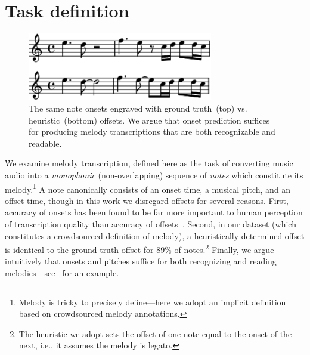\section{Task definition}
\label{sec:task}

\begin{figure}
    \centering
    \includegraphics[width=8.1cm]{figs/heuristic_offsets.pdf}
    \caption{
The same note onsets engraved with ground truth~(top) vs. heuristic~(bottom) offsets. 
We argue that onset prediction suffices for producing melody transcriptions that are both recognizable and readable. 
}
 \label{fig:heuristic_offsets}
\end{figure}


We examine melody transcription, defined here as the task of converting music audio into a \emph{monophonic} (non-overlapping) sequence of \emph{notes} which constitute its melody.\footnote{Melody is tricky to precisely define---here we adopt an implicit definition based on crowdsourced melody annotations.} 
A note canonically consists of an onset time, a musical pitch, and an offset time, though in this work  
we disregard offsets for several reasons. 
First, accuracy of onsets has been found to be far more important to human perception of transcription quality than accuracy of offsets~\cite{ycart2020investigating}. 
Second, in our dataset (which constitutes a crowdsourced definition of melody), a heuristically-determined offset is identical to the ground truth offset for $89\%$ of notes.\footnote{The heuristic we adopt sets the offset of one note equal to the onset of the next, i.e., it assumes the melody is legato.}
Finally, we argue intuitively that onsets and pitches suffice for both recognizing and reading melodies---see~ for an example. 

